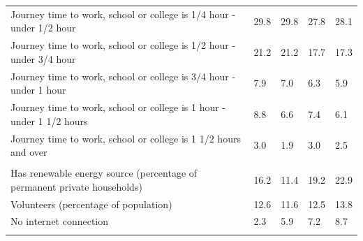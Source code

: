 \documentclass{article}
\begin{document}
\begin{table}[h]
\begin{tabular}{KTTTT}
Journey time to work, school or college is 1/4 hour - under 1/2 hour & 29.8& 29.8& 27.8& 28.1\\
Journey time to work, school or college is 1/2 hour - under 3/4 hour & 21.2& 21.2& 17.7& 17.3\\
Journey time to work, school or college is 3/4 hour - under 1 hour & 7.9& 7.0& 6.3& 5.9\\
Journey time to work, school or college is 1 hour - under 1 1/2 hours & 8.8& 6.6& 7.4& 6.1\\
Journey time to work, school or college is 1 1/2 hours and over & 3.0& 1.9& 3.0& 2.5\\
\hline
    \\ 
    \hline
Has renewable energy source (percentage of permanent private households) & 16.2& 11.4& 19.2& 22.9\\
    \hline
Volunteers (percentage of population) & 12.6& 11.6& 12.5& 13.8\\
    \hline
No internet connection& 2.3& 5.9& 7.2& 8.7\\
\hline
\end{tabular}
\end{table}
\end{document}
